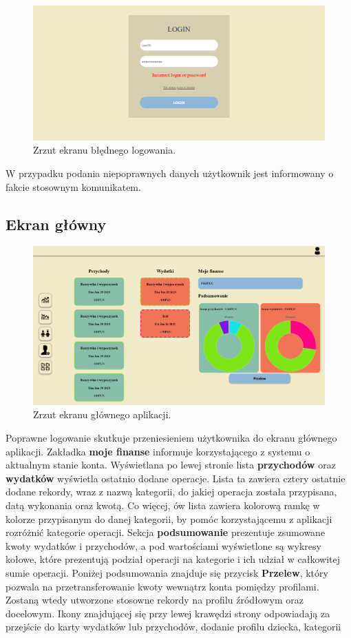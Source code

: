 \documentclass[12pt,a4paper,oneside]{article}
\begin{document}
\begin{figure}[H]
    \centering
    \includegraphics[width=\hsize,keepaspectratio]{images/login_failed.png}
    \caption{Zrzut ekranu błędnego logowania.}
\end{figure}
W przypadku podania niepoprawnych danych użytkownik jest informowany o fakcie
stosownym komunikatem.

\subsection{Ekran główny}
\begin{figure}[H]
    \centering
    \includegraphics[width=\hsize,keepaspectratio]{images/profile.png}
    \caption{Zrzut ekranu głównego aplikacji.}
\end{figure}
Poprawne logowanie skutkuje przeniesieniem użytkownika do ekranu głównego 
aplikacji. Zakładka \textbf{moje finanse} informuje korzystającego z systemu o
aktualnym stanie konta. Wyświetlana po lewej stronie lista \textbf{przychodów} 
oraz \textbf{wydatków} wyświetla ostatnio dodane operacje. Lista ta zawiera 
cztery ostatnie dodane rekordy, wraz z nazwą kategorii, do jakiej operacja 
została przypisana, datą wykonania oraz kwotą. Co więcej, ów lista zawiera 
kolorową ramkę w kolorze przypisanym do danej kategorii, by pomóc korzystającemu
z aplikacji rozróżnić kategorie operacji. Sekcja \textbf{podsumowanie}
prezentuje zsumowane kwoty wydatków i przychodów, a pod wartościami wyświetlone
są wykresy kołowe, które prezentują podział operacji na kategorie i ich udział w
całkowitej sumie operacji. Poniżej podsumowania znajduje się przycisk
\textbf{Przelew}, który pozwala na przetransferowanie kwoty wewnątrz konta
pomiędzy profilami. Zostaną wtedy utworzone stosowne rekordy na profilu źródłowym
oraz docelowym. Ikony znajdującej się przy lewej krawędzi strony odpowiadają za
przejście do karty wydatków lub przychodów, dodanie profilu dziecka, kategorii
\end{document}
